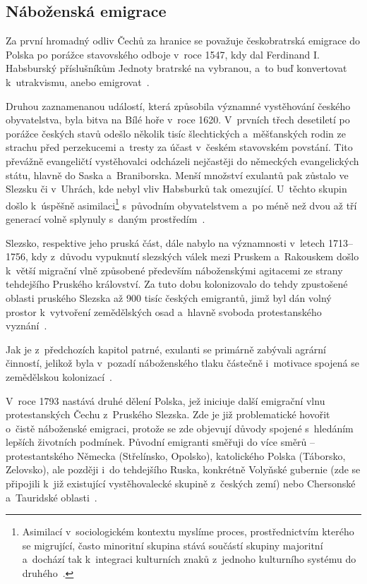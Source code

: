 \hypertarget{nuxe1boux17eenskuxe1-emigrace}{%
\subsection{Náboženská emigrace}\label{nuxe1boux17eenskuxe1-emigrace}}

Za první hromadný odliv Čechů za hranice se považuje českobratrská emigrace do Polska po porážce stavovského odboje v~roce 1547, kdy dal Ferdinand I. Habsburský příslušníkům Jednoty bratrské na vybranou, a~to buď konvertovat k~utrakvismu, anebo emigrovat~\parencite{Vaculik2009a}.

Druhou zaznamenanou událostí, která způsobila významné vystěhování českého obyvatelstva, byla bitva na Bílé hoře v~roce 1620. V~prvních třech desetiletí po porážce českých stavů odešlo několik tisíc šlechtických a~měšťanských rodin ze strachu před perzekucemi a~tresty za účast v~českém stavovském povstání. Tito převážně evangeličtí vystěhovalci odcházeli nejčastěji do německých evangelických státu, hlavně do Saska a~Braniborska. Menší množství exulantů pak zůstalo ve Slezsku či v~Uhrách, kde nebyl vliv Habsburků tak omezující. U~těchto skupin došlo k~úspěšně asimilaci\footnote{Asimilací v~sociologickém kontextu myslíme proces, prostřednictvím kterého se migrující, často minoritní skupina stává součástí skupiny majoritní a~dochází tak k~integraci kulturních znaků z~jednoho kulturního systému do druhého~\parencite{Petrusek2017}.} s~původním obyvatelstvem a~po méně než dvou až tří generací volně splynuly s~daným prostředím~\parencite{Vaculik2002}.

Slezsko, respektive jeho pruská část, dále nabylo na významnosti v~letech 1713--1756, kdy z~důvodu vypuknutí slezských válek mezi Pruskem a~Rakouskem došlo k~větší migrační vlně způsobené především náboženskými agitacemi ze strany tehdejšího Pruského království. Za tuto dobu kolonizovalo do tehdy zpustošené oblasti pruského Slezska až 900 tisíc českých emigrantů, jimž byl dán volný prostor k~vytvoření zemědělských osad a~hlavně svoboda protestanského vyznání~\parencite{Vaculik2002}.

Jak je z~předchozích kapitol patrné, exulanti se primárně zabývali agrární činností, jelikož byla v~pozadí náboženského tlaku částečně i~motivace spojená se zemědělskou kolonizací~\parencite{Broucek2017}.

V~roce 1793 nastává druhé dělení Polska, jež iniciuje další emigrační vlnu protestanských Čechu z~Pruského Slezska. Zde je již problematické hovořit o~čistě náboženské emigraci, protože se zde objevují důvody spojené s~hledáním lepších životních podmínek. Původní emigranti směřuji do více směrů -- protestantského Německa (Střelínsko, Opolsko), katolického Polska (Táborsko, Zelovsko), ale později i~do tehdejšího Ruska, konkrétně Volyňské gubernie (zde se připojili k~již existující vystěhovalecké skupině z~českých zemí) nebo Chersonské a~Tauridské oblasti~\parencite{Vaculik2009a}.

